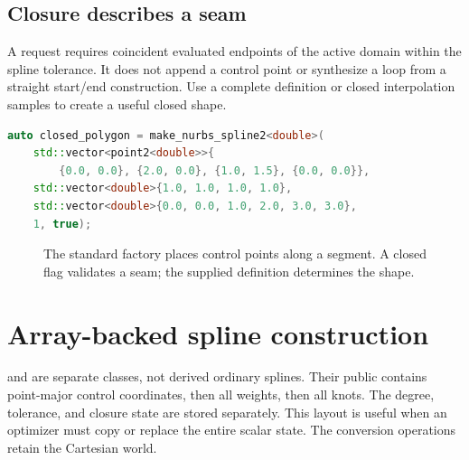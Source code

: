 \subsection{Closure describes a seam}

A  request requires coincident evaluated endpoints of
the active domain within the spline tolerance. It does not append a control
point or synthesize a loop from a straight start/end construction. Use a
complete definition or closed interpolation samples to create a useful closed
shape.

\begin{lstlisting}[language=C++]
auto closed_polygon = make_nurbs_spline2<double>(
    std::vector<point2<double>>{
        {0.0, 0.0}, {2.0, 0.0}, {1.0, 1.5}, {0.0, 0.0}},
    std::vector<double>{1.0, 1.0, 1.0, 1.0},
    std::vector<double>{0.0, 0.0, 1.0, 2.0, 3.0, 3.0},
    1, true);
\end{lstlisting}

\begin{figure}[htbp]
\centering
{}
\caption{The standard factory places control points along a segment. A
closed flag validates a seam; the supplied definition determines the shape.}
\end{figure}

\section{Array-backed spline construction}

 and  are separate classes,
not derived ordinary splines. Their public 
contains point-major control coordinates, then all weights, then all knots.
The degree, tolerance, and closure state are stored separately. This layout
is useful when an optimizer must copy or replace the entire scalar state.
The conversion operations retain the Cartesian world.

